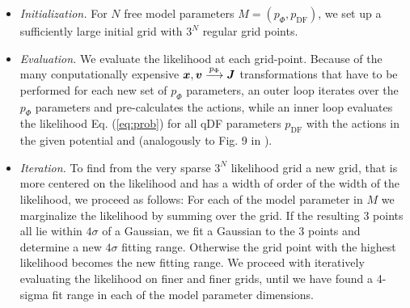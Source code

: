 \begin{itemize}

\item \emph{Initialization.} For $N$ free model parameters $M=(p_\Phi,p_\text{DF})$, we set up a sufficiently large initial grid with $3^N$ regular grid points.

\item  \emph{Evaluation.} We evaluate the likelihood at each grid-point. Because of the many conputationally expensive $\boldsymbol{x},\boldsymbol{v} \overset{p_\Phi}{\longrightarrow} \boldsymbol{J}$ transformations that have to be performed for each new set of $p_\Phi$ parameters, an outer loop iterates over the $p_\Phi$ parameters and pre-calculates the actions, while an inner loop evaluates the likelihood Eq. (\ref{eq:prob}) for all qDF parameters $p_\text{DF}$ with the actions in the given potential and (analogously to Fig. 9 in \citet{bov13}).

\item \emph{Iteration.} To find from the very sparse $3^N$ likelihood grid a new grid, that is more centered on the likelihood and has a width of order of the width of the likelihood, we proceed as follows: For each of the model parameter in $M$ we marginalize the likelihood by summing over the grid. If the resulting 3 points all lie within $4\sigma$ of a Gaussian, we fit a Gaussian to the 3 points and determine a new $4\sigma$ fitting range. Otherwise the grid point with the highest likelihood becomes the new fitting range. We proceed with iteratively evaluating the likelihood on finer and finer grids, until we have found a 4-sigma fit range in each of the model parameter dimensions.


\end{itemize}

